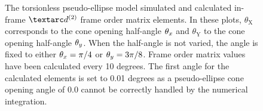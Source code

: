 \begin{figure}
\begin{tabular}{@{}cc@{}}
  \end{tabular}
  \caption[Torsionless pseudo-ellipse simulated and calculated in-frame $\FOtwo$ elements.]{
    The torsionless pseudo-ellipse model simulated and calculated in-frame $\FOtwo$ frame order matrix elements.
    In these plots, $\theta_\textrm{X}$ corresponds to the cone opening half-angle $\theta_x$ and $\theta_\textrm{Y}$ to the cone opening half-angle $\theta_y$.
    When the half-angle is not varied, the angle is fixed to either $\theta_x = \pi/4$ or $\theta_y = 3\pi/8$.
    Frame order matrix values have been calculated every 10 degrees.
    The first angle for the calculated elements is set to 0.01 degrees as a pseudo-ellipse cone opening angle of 0.0 cannot be correctly handled by the numerical integration.
  }
  \label{fig: simulated and calculated in-frame 2nd degree pseudo-ellipse, torsionless frame order}
\end{figure}

